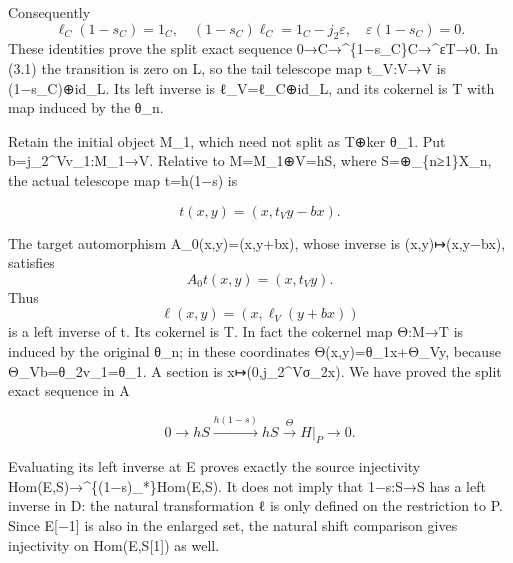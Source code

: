 \documentclass[11pt]{article}
\begin{document}
Consequently \[
 \ell_C(1-s_C)=1_C,\quad
 (1-s_C)\ell_C=1_C-j_2\varepsilon,\quad
 \varepsilon(1-s_C)=0.
\] These identities prove the split exact sequence 0\allowbreak{}→C\allowbreak{}→\textasciicircum{}\{1−s\_\allowbreak{}C\}C\allowbreak{}→\textasciicircum{}εT\allowbreak{}→0. In (3.1)\allowbreak{} the transition is zero on L,\allowbreak{} so the tail telescope map t\_\allowbreak{}V:\allowbreak{}V\allowbreak{}→V is (1−s\_\allowbreak{}C)\allowbreak{}\allowbreak{}⊕id\_\allowbreak{}L. Its left inverse is ℓ\_\allowbreak{}V\allowbreak{}=ℓ\_\allowbreak{}C\allowbreak{}⊕id\_\allowbreak{}L,\allowbreak{} and its cokernel is T with map induced by the θ\_\allowbreak{}n.

Retain the initial object M\_\allowbreak{}1,\allowbreak{} which need not split as T\allowbreak{}⊕ker θ\_\allowbreak{}1. Put b\allowbreak{}=j\_\allowbreak{}2\textasciicircum{}Vv\_\allowbreak{}1:\allowbreak{}M\_\allowbreak{}1\allowbreak{}→V. Relative to M\allowbreak{}=M\_\allowbreak{}1\allowbreak{}⊕V\allowbreak{}=hS,\allowbreak{} where S\allowbreak{}=\allowbreak{}⊕\_\allowbreak{}\{n≥1\}X\_\allowbreak{}n,\allowbreak{} the actual telescope map t\allowbreak{}=h(1−s)\allowbreak{} is

\[
 t(x,y)=(x,t_Vy-bx).
\]

The target automorphism A\_\allowbreak{}0(x,\allowbreak{}y)\allowbreak{}\allowbreak{}=(x,\allowbreak{}y\allowbreak{}+bx)\allowbreak{},\allowbreak{} whose inverse is (x,\allowbreak{}y)\allowbreak{}\allowbreak{}↦(x,\allowbreak{}y−bx)\allowbreak{},\allowbreak{} satisfies \[
 A_0t(x,y)=(x,t_Vy).
\] Thus \[
 \ell(x,y)=(x,\ell_V(y+bx))
\] is a left inverse of t. Its cokernel is T. In fact the cokernel map Θ:\allowbreak{}M\allowbreak{}→T is induced by the original θ\_\allowbreak{}n; in these coordinates Θ(x,\allowbreak{}y)\allowbreak{}\allowbreak{}=θ\_\allowbreak{}1x\allowbreak{}+Θ\_\allowbreak{}Vy,\allowbreak{} because Θ\_\allowbreak{}Vb\allowbreak{}=θ\_\allowbreak{}2v\_\allowbreak{}1\allowbreak{}=θ\_\allowbreak{}1. A section is x\allowbreak{}↦(0,\allowbreak{}j\_\allowbreak{}2\textasciicircum{}Vσ\_\allowbreak{}2x)\allowbreak{}. We have proved the split exact sequence in A

\[
 0\longrightarrow hS\xrightarrow{h(1-s)}hS
          \xrightarrow{\Theta}H|_P\longrightarrow0. \tag{3.2}
\]

Evaluating its left inverse at E proves exactly the source injectivity Hom(E,\allowbreak{}S)\allowbreak{}\allowbreak{}→\textasciicircum{}\{(1−s)\allowbreak{}\_\allowbreak{}*\}Hom(E,\allowbreak{}S)\allowbreak{}. It does not imply that 1−s:\allowbreak{}S\allowbreak{}→S has a left inverse in D:\allowbreak{} the natural transformation ℓ is only defined on the restriction to P. Since E[−1]\allowbreak{} is also in the enlarged set,\allowbreak{} the natural shift comparison gives injectivity on Hom(E,\allowbreak{}S[1]\allowbreak{})\allowbreak{} as well.
\end{document}
